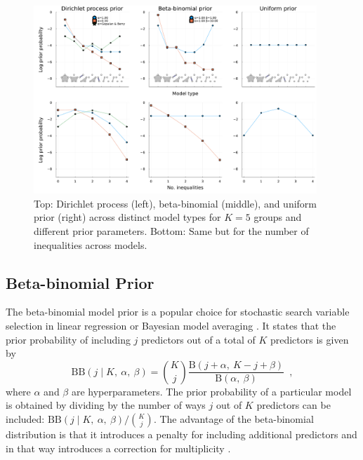 \documentclass[11pt,a4paper]{article}
\theoremstyle{definition} %
\theoremstyle{case}
\newcommand{\FBeta}[2]{\text{B}\left({#1},\ {#2}\right)}
\newcommand{\BetaBinom}[4]{\text{BB}\left(#1 \mid #2 ,\ #3 ,\ #4 \right)}
\begin{document}
\begin{figure}
    \centering
    \includegraphics[width = 0.95\textwidth]{figures/visualizePriors_2x3.pdf}
    \caption{Top: Dirichlet process (left), beta-binomial (middle), and uniform prior (right) across distinct model types for $K = 5$ groups and different prior parameters. Bottom: Same but for the number of inequalities across models.} %
    \label{fig:prior-comparison}
\end{figure}


\subsection{Beta-binomial Prior}

The beta-binomial model prior is a popular choice for stochastic search variable selection in linear regression \parencite[][]{george1993variable} or Bayesian model averaging \parencite[e.g.,][]{hinne2020conceptual, hoeting1999bayesian}. It states that the prior probability of including $j$ predictors out of a total of $K$ predictors is given by
\begin{equation}
    \BetaBinom{j}{K}{\alpha}{\beta} = \binom{K}{j} \frac{\FBeta{j + \alpha}{K - j + \beta}}{\FBeta{\alpha}{\beta}} \enspace ,
\end{equation}
where $\alpha$ and $\beta$ are hyperparameters. The prior probability of a particular model is obtained by dividing by the number of ways $j$ out of $K$ predictors can be included: $\BetaBinom{j}{K}{\alpha}{\beta} / \binom{K}{j}$. The advantage of the beta-binomial distribution is that it introduces a penalty for including additional predictors and in that way introduces a correction for multiplicity \parencite{scott2006exploration, scott2010bayes}.
\end{document}
